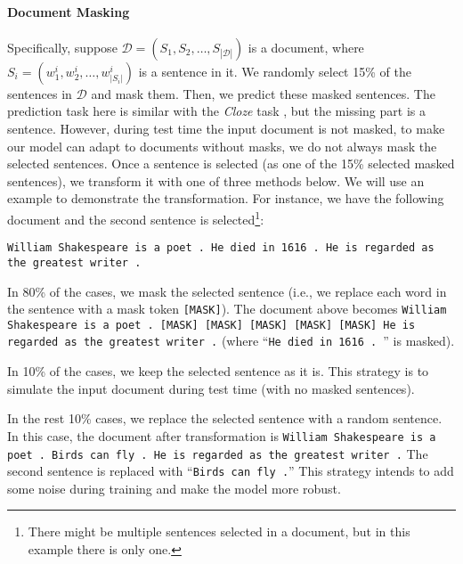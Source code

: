 \documentclass[11pt,a4paper]{article}
\begin{document}
\paragraph{Document Masking} Specifically, suppose $\mathcal{D} = (S_1, S_2, \dots, S_{| \mathcal{D} |})$ is a document,  where $S_i = (w_1^i, w_2^i, \dots, w_{|S_i|}^i)$ is a sentence in it. We randomly select 15\% of the sentences in $\mathcal{D}$ and mask them. Then, we predict these masked sentences. The prediction task here is similar with the \emph{Cloze} task \cite{taylor:1953:sage,devlin:2018:arxiv}, but the missing part is a sentence. However,  during test time the input document is not masked, to make our model can adapt to documents without masks, we do not always mask the selected sentences. Once a sentence is selected (as one of the 15\% selected masked sentences), we transform it with one of three methods below. We will use an example to demonstrate the transformation. For instance, we have the following document and the second sentence is selected\footnote{There might be multiple sentences selected in a document, but in this example there is only one.}:

{\tt \noindent William Shakespeare is a poet . He died in 1616 . He is regarded as the greatest writer .}

In 80\% of the cases, we mask the selected sentence (i.e., we replace each word in the sentence with a mask token {\tt [MASK]}). The document above becomes {\tt William Shakespeare is a poet . [MASK] [MASK] [MASK] [MASK] [MASK] He is regarded as the greatest writer .} (where ``{\tt He died in 1616 . }'' is masked). 

In 10\% of the cases,  we keep the selected sentence as it is. This strategy is to simulate the input document during test time (with no masked sentences).

In the rest 10\% cases, we replace the selected sentence with a random sentence. In this case, the document after transformation is {\tt William Shakespeare is a poet . Birds can fly . He is regarded as the greatest writer .}  The second sentence is replaced with ``{\tt Birds can fly .}'' This strategy intends to add some noise during training and make the model more robust.
\end{document}
